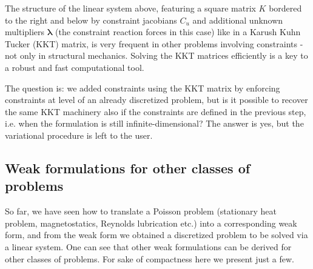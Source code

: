 \documentclass{digitaldynamics}
\def\vect#1{\bm{#1}}
\def\matr#1{{#1}}
\begin{document}
The structure of the linear system above, featuring a square matrix $\matr{K}$ bordered to the right and below by constraint jacobians $\matr{C}_u$ and additional unknown multipliers $\vect{\lambda}$ (the constraint reaction forces in this case) like in a Karush Kuhn Tucker (KKT) matrix, is very frequent in other problems involving constraints - not only in structural mechanics. Solving the KKT matrices efficiently is a key to a robust and fast computational tool.

The question is: we added constraints using the KKT matrix by enforcing constraints at level of an already discretized problem, but is it possible to recover the same KKT machinery also if the constraints are defined in the previous step, i.e. when the formulation is still infinite-dimensional? The answer is yes, but the variational procedure is left to the user.


\subsection{Weak formulations for other classes of problems}

So far, we have seen how to translate a Poisson problem (stationary heat problem, magnetostatics, Reynolds lubrication etc.) into a corresponding weak form, and from the weak form we obtained a discretized problem to be solved via a linear system. One can see that other weak formulations can be derived for other classes of problems. For sake of compactness here we present just a few.
\end{document}
